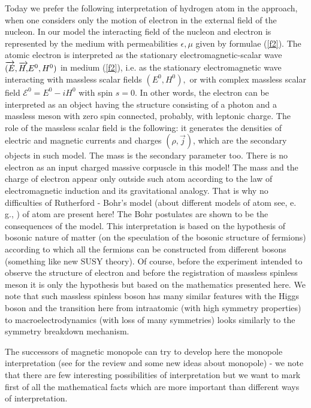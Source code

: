 \documentclass[a4paper,12pt]{article}
\begin{document}
Today we prefer the following interpretation of hydrogen atom in the
approach, when one considers only the motion of electron in the external
field of the nucleon. In our model the interacting field of the nucleon and
electron is represented by the medium with permeabilities $\epsilon ,\mu $
given by formulae (\ref{f2}). The atomic electron is interpreted as the
stationary electromagnetic-scalar wave $\overrightarrow{(E},\overrightarrow{%
H,}E^0,H^0)$ in medium (\ref{f2}), i.e. as the stationary electromagnetic
wave interacting with massless scalar fields $(E^0,H^0),$ or with complex
massless scalar field $\mathcal{E}^0=E^0-iH^0$ with spin $s=0$. In other
words, the electron can be interpreted as an object having the structure
consisting of a photon and a massless meson with zero spin connected,
probably, with leptonic charge. The role of the massless scalar field is the
following: it generates the densities of electric and magnetic currents and
charges $(\rho ,\overrightarrow{j})$, which are the secondary objects in
such model. The mass is the secondary parameter too. There is no electron as
an input charged massive corpuscle in this model! The mass and the charge of
electron appear only outside such atom according to the law of
electromagnetic induction and its gravitational analogy. That is why no
difficulties of Rutherford - Bohr's model (about different models of atom
see, e. g., \cite{LAK}) of atom are present here! The Bohr postulates are
shown to be the consequences of the model. This interpretation is based on
the hypothesis of bosonic nature of matter (on the speculation of the
bosonic structure of fermions) according to which all the fermions can be
constructed from different bosons (something like new SUSY theory). Of
course, before the experiment intended to observe the structure of electron
and before the registration of massless spinless meson it is only the
hypothesis but based on the mathematics presented here. We note that such
massless spinless boson has many similar features with the Higgs boson and
the transition here from intraatomic (with high symmetry properties) to
macroelectrodynamics (with loss of many symmetries) looks similarly to the
symmetry breakdown mechanism.

The successors of magnetic monopole can try to develop here the monopole
interpretation (see \cite{Lochak} for the review and some new ideas about
monopole) - we note that there are few interesting possibilities of
interpretation but we want to mark first of all the mathematical facts which
are more important than different ways of interpretation.
\end{document}
